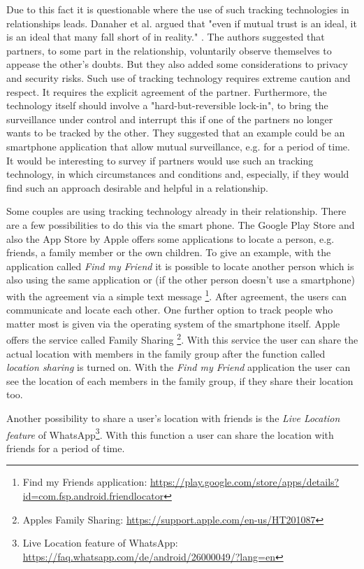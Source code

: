 Due to this fact it is questionable where the use of such tracking technologies in relationships leads.
Danaher et al. argued that "even if mutual trust is an ideal, it is an ideal that many fall short of in reality." \cite{doi:10.1080/15265161.2017.1409823}.
The authors suggested that partners, to some part in the relationship, voluntarily observe themselves to appease the other's doubts. But they also added some considerations to privacy and security risks. Such use of tracking technology requires extreme caution and respect. It requires the explicit agreement of the partner. Furthermore, the technology itself should involve a "hard-but-reversible lock-in", to bring the surveillance under control and interrupt this if one of the partners no longer wants to be tracked by the other.
They suggested that an example could be an smartphone application that allow mutual surveillance, e.g. for a period of time.
It would be interesting to survey if partners would use such an tracking technology, in which circumstances and conditions and, especially, if they would find such an approach desirable and helpful in a relationship. 

Some couples are using tracking technology already in their relationship. %
There are a few possibilities to do this via the smart phone. The Google Play Store and also the App Store by Apple offers some applications to locate a person, e.g. friends, a family member or the own children. To give an example, with the application called \textit{Find my Friend} it is possible to locate another person which is also using the same application or (if the other person doesn't use a smartphone) with the agreement via a simple text message \footnote{Find my Friends application: \url{https://play.google.com/store/apps/details?id=com.fsp.android.friendlocator}}. After agreement, the users can communicate and locate each other.
One further option to track people who matter most is given via the operating system of the smartphone itself. Apple offers the service called Family Sharing \footnote{Apples Family Sharing: \url{https://support.apple.com/en-us/HT201087}}. With this service the user can share the actual location with members in the family group after the function called \textit{location sharing} is turned on. With the \textit{Find my Friend} application the user can see the location of each members in the family group, if they share their location too.

Another possibility to share a user's location with friends is the \textit{Live Location feature} of WhatsApp\footnote{Live Location feature of WhatsApp: \url{https://faq.whatsapp.com/de/android/26000049/?lang=en}}. With this function a user can share the location with friends for a period of time.

